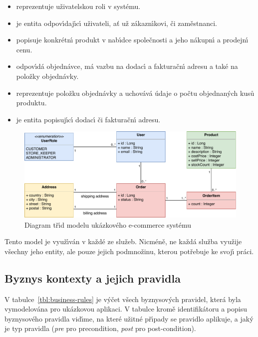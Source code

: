 \begin{itemize}
    \item \textbf{} reprezentuje uživatelskou roli v systému.
    \item \textbf{} je entita odpov\'{\i}daj\'{\i}c\'{\i} uživateli, ať už zákazn\'{\i}kovi, či zaměstnanci.
    \item \textbf{} popisuje konkrétn\'{\i} produkt v nab\'{\i}dce společnosti a jeho nákupn\'{\i} a prodejn\'{\i} cenu.
    \item \textbf{} odpov\'{\i}dá objednávce, má vazbu na dodac\'{\i} a fakturačn\'{\i} adresu a také na položky objednávky.
    \item \textbf{} reprezentuje položku objednávky a uchovává údaje o počtu objednan\'ych kusů produktu.
    \item \textbf{} je entita popisuj\'{\i}c\'{\i} dodac\'{\i} či fakturačn\'{\i} adresu.
\end{itemize}

\begin{figure}
    \centering
    \includegraphics[keepaspectratio=true, width=0.9\linewidth]{figures/example-model.pdf}
    \caption{Diagram tř\'{\i}d modelu ukázkového e-commerce systému}
    \label{fig:example-model}
\end{figure}

Tento model je využ\'{\i}ván v každé ze služeb. Nicméně, ne každá služba využije všechny jeho entity,
ale pouze jejich podmnožinu, kterou potřebuje ke svoj\'{\i} práci.

\subsection{Byznys kontexty a jejich pravidla}

V tabulce~\ref{tbl:business-rules} je v\'yčet všech byznysov\'ych pravidel, která byla
vymodelována pro ukázkovou aplikaci. V tabulce kromě identifikátoru a popisu byznysového pravidla
vid\'{\i}me, na které užitné př\'{\i}pady se pravidlo aplikuje, a jak\'y je typ pravidla
(\textit{pre} pro precondition, \textit{post} pro post-condition).

